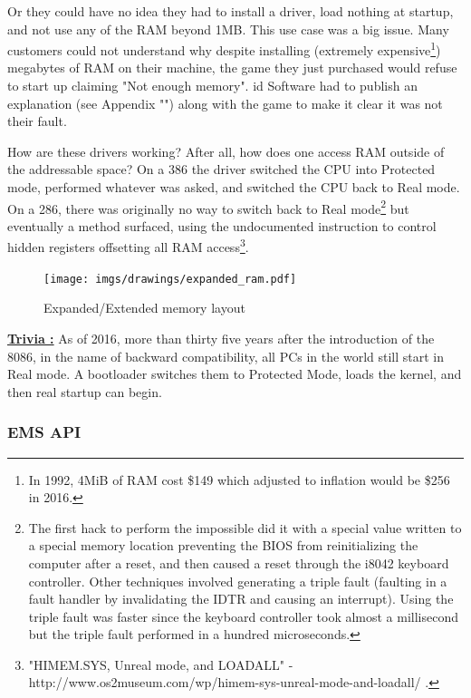 \documentclass[book.tex]{subfiles}
\begin{document}
Or they could have no idea they had to install a driver, load nothing at startup, and not use any of the RAM beyond 1MB. This use case was a big issue. Many customers could not understand why despite installing (extremely expensive\footnote{In 1992, 4MiB of RAM cost \$149 which adjusted to inflation would be \$256 in 2016.}) megabytes of RAM on their machine, the game they just purchased would refuse to start up claiming "Not enough memory". id Software had to publish an explanation (see Appendix "") along with the game to make it clear it was not their fault.\\
\par
How are these drivers working? After all, how does one access RAM outside of the addressable space? On a 386 the driver switched the CPU into Protected mode, performed whatever was asked, and switched the CPU back to Real mode. On a 286, there was originally no way to switch back to Real mode\footnote{The first hack to perform the impossible did it with a special value written to a special memory location preventing the BIOS from reinitializing the computer after a reset, and then caused a reset through the i8042 keyboard controller. Other techniques involved generating a triple fault (faulting in a fault handler by invalidating the IDTR and causing an interrupt). Using the triple fault was faster since the keyboard controller took almost a millisecond but the triple fault performed in a hundred microseconds.} but eventually a method surfaced, using the undocumented  instruction to control hidden registers offsetting all RAM access\footnote{"HIMEM.SYS, Unreal mode, and LOADALL" - http://www.os2museum.com/wp/himem-sys-unreal-mode-and-loadall/ .}.

\begin{figure}[H]
\centering
\texttt{[image: imgs/drawings/expanded\_ram.pdf]}
\caption{Expanded/Extended memory layout}
\label{fig:ems_xms_layout}
\end{figure}


\textbf{\underline{Trivia :}}  As of 2016, more than thirty five years after the introduction of the 8086, in the name of backward compatibility, all PCs in the world still start in Real mode. A bootloader switches them to Protected Mode, loads the kernel, and then real startup can begin.


\subsubsection{EMS API}
\end{document}
